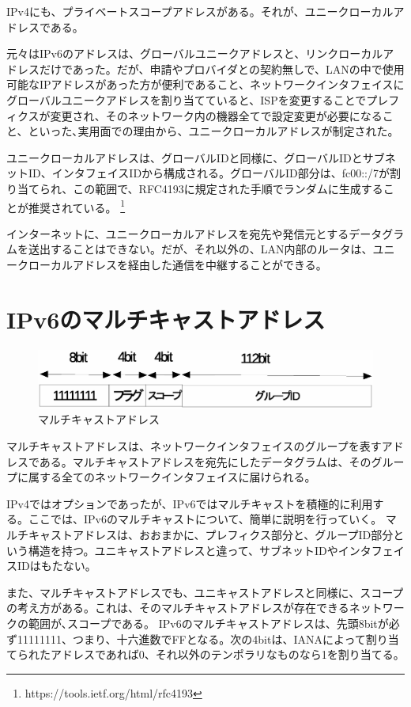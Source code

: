 IPv4にも、プライベートスコープアドレスがある。それが、ユニークローカルアドレスである。

元々はIPv6のアドレスは、グローバルユニークアドレスと、リンクローカルアドレスだけであった。だが、申請やプロバイダとの契約無しで、LANの中で使用可能なIPアドレスがあった方が便利であること、ネットワークインタフェイスにグローバルユニークアドレスを割り当てていると、ISPを変更することでプレフィクスが変更され、そのネットワーク内の機器全てで設定変更が必要になること、といった､実用面での理由から、ユニークローカルアドレスが制定された。

ユニークローカルアドレスは、グローバルIDと同様に、グローバルIDとサブネットID、インタフェイスIDから構成される。グローバルID部分は、fc00::/7が割り当てられ、この範囲で、RFC4193に規定された手順でランダムに生成することが推奨されている。
\footnote{https://tools.ietf.org/html/rfc4193}

インターネットに、ユニークローカルアドレスを宛先や発信元とするデータグラムを送出することはできない。だが、それ以外の、LAN内部のルータは、ユニークローカルアドレスを経由した通信を中継することができる。

\section{IPv6のマルチキャストアドレス}

\begin{figure}[htbp]
	\includegraphics[width=12cm,clip]{draw/6multicast.eps}
	\caption{マルチキャストアドレス}
	\label{fig:6multicastaddr}
\end{figure}
マルチキャストアドレスは、ネットワークインタフェイスのグループを表すアドレスである。マルチキャストアドレスを宛先にしたデータグラムは、そのグループに属する全てのネットワークインタフェイスに届けられる。

IPv4ではオプションであったが、IPv6ではマルチキャストを積極的に利用する。ここでは、IPv6のマルチキャストについて、簡単に説明を行っていく。
マルチキャストアドレスは、おおまかに、プレフィクス部分と、グループID部分という構造を持つ。ユニキャストアドレスと違って、サブネットIDやインタフェイスIDはもたない。

また、マルチキャストアドレスでも、ユニキャストアドレスと同様に、スコープの考え方がある。これは、そのマルチキャストアドレスが存在できるネットワークの範囲が､スコープである。
IPv6のマルチキャストアドレスは、先頭8bitが必ず11111111、つまり、十六進数でFFとなる。次の4bitは、IANAによって割り当てられたアドレスであれば0、それ以外のテンポラリなものなら1を割り当てる。

